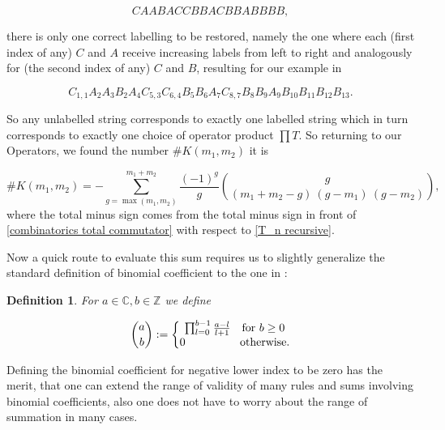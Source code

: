 \documentclass[b5paper,draft,openbib,12pt]{memoir}
\newtheorem{Def}{Definition}[section]
\begin{document}
\begin{equation}
C A A B A C C B B A C B B A B B B B,
\end{equation}

there is only one correct labelling to be restored, namely the one where each (first index of 
any) \(C\) and \(A\) receive increasing labels from left to right and analogously for (the second 
 index of any) \(C\) and \(B\), resulting for our example in
 
\begin{equation}
 C_{1,1} A_2 A_3 B_2 A_4 C_{5,3} C_{6,4} B_{5} B_6 A_7 C_{8,7} B_8 B_9 A_9 B_{10} B_{11} B_{12} B_{13}.
\end{equation}

So any unlabelled  string corresponds to exactly one labelled string which in turn corresponds to 
exactly one choice of operator product \(\prod T\). 
So returning to our Operators, we found the number \(\#K(m_1,m_2)\) it is

\begin{equation}\label{combinatorics binomial sum}
\#K(m_1,m_2) =-\sum_{g=\max(m_1,m_2)}^{m_1+m_2} \frac{(-1)^g}{g} \binom{g}{(m_1+m_2-g) \ (g-m_1) \ (g - m_2)},
\end{equation}
where the total minus sign comes from the total minus sign in front of \eqref{combinatorics total commutator}
with respect to \eqref{T_n recursive}. 

Now a quick route to evaluate this sum requires us to slightly generalize the standard definition of
binomial coefficient to the one in \cite{graham1994concrete}:

\begin{Def}
For \(a\in\mathbb{C}, b\in\mathbb{Z}\) we define

\begin{equation}
\binom{a}{b} := \left\{\begin{matrix}
\prod_{l=0}^{b-1} \frac{a-l}{l+1} \quad \text{for } b\ge 0\\
0 \hspace{1.7cm} \text{otherwise.}
\end{matrix}\right.
\end{equation}
\end{Def}

Defining the binomial coefficient for negative lower index to be zero has the merit, that one can extend the
range of validity of many rules and sums involving binomial coefficients, also one does not have 
to worry about the range of summation in many cases.
\end{document}
